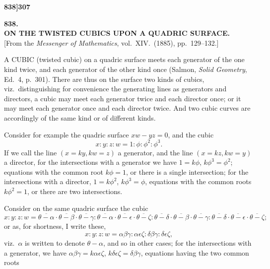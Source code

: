 \documentclass[11pt,a4paper]{book}
\begin{document}
\noindent\textbf{838]}\hfill\textbf{307}

\bigskip

\begin{center}
{\Large\textbf{838.}}\\[1em]
{\large\textbf{ON THE TWISTED CUBICS UPON A QUADRIC SURFACE.}}\\[1em]
[From the \textit{Messenger of Mathematics}, vol.\ XIV.\ (1885), pp.\ 129--132.]
\end{center}

\bigskip

\noindent A CUBIC (twisted cubic) on a quadric surface meets each generator of the one kind twice, and each generator of the other kind once (Salmon, \textit{Solid Geometry}, Ed.\ 4, p.\ 301). There are thus on the surface two kinds of cubics, viz.\ distinguishing for convenience the generating lines as generators and directors, a cubic may meet each generator twice and each director once; or it may meet each generator once and each director twice. And two cubic curves are accordingly of the same kind or of different kinds.

Consider for example the quadric surface $xw - yz = 0$, and the cubic
\[
x : y : z : w = 1 : \phi : \phi^2 : \phi^3.
\]
If we call the line $(x = ky, kw = z)$ a generator, and the line $(x = kz, kw = y)$ a director, for the intersections with a generator we have $1 = k\phi$, $k\phi^3 = \phi^2$; equations with the common root $k\phi = 1$, or there is a single intersection; for the intersections with a director, $1 = k\phi^2$, $k\phi^3 = \phi$, equations with the common roots $k\phi^2 = 1$, or there are two intersections.

Consider on the same quadric surface the cubic
\[
x : y : z : w = \overline{\theta - \alpha} \cdot \overline{\theta - \beta} \cdot \overline{\theta - \gamma} : \overline{\theta - \alpha} \cdot \overline{\theta - \epsilon} \cdot \overline{\theta - \zeta} : \overline{\theta - \delta} \cdot \overline{\theta - \beta} \cdot \overline{\theta - \gamma} : \overline{\theta - \delta} \cdot \overline{\theta - \epsilon} \cdot \overline{\theta - \zeta};
\]
or as, for shortness, I write these,
\[
x : y : z : w = \alpha\beta\gamma : \alpha\epsilon\zeta : \delta\beta\gamma : \delta\epsilon\zeta,
\]
viz.\ $\alpha$ is written to denote $\theta - \alpha$, and so in other cases; for the intersections with a generator, we have $\alpha\beta\gamma = k\alpha\epsilon\zeta$, $k\delta\epsilon\zeta = \delta\beta\gamma$, equations having the two common roots
\end{document}
